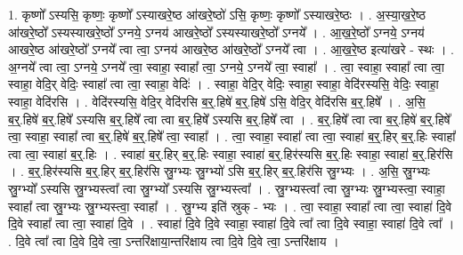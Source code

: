 \documentclass[17pt]{extarticle}
\begin{document}
1. कृष्णो᳚ ऽस्यसि॒ कृष्णः॒ कृष्णो᳚ ऽस्याखरे॒ष्ठ आ॑खरे॒ष्ठो॑ ऽसि॒ कृष्णः॒ कृष्णो᳚ ऽस्याखरे॒ष्ठः । . अ॒स्या॒ख॒रे॒ष्ठ आ॑खरे॒ष्ठो᳚ ऽस्यस्याखरे॒ष्ठो᳚ ऽग्नये॒ ऽग्नय॑ आखरे॒ष्ठो᳚ ऽस्यस्याखरे॒ष्ठो᳚ ऽग्नये᳚ । . आ॒ख॒रे॒ष्ठो᳚ ऽग्नये॒ ऽग्नय॑ आखरे॒ष्ठ आ॑खरे॒ष्ठो᳚ ऽग्नये᳚ त्वा त्वा॒ ऽग्नय॑ आखरे॒ष्ठ आ॑खरे॒ष्ठो᳚ ऽग्नये᳚ त्वा । . आ॒ख॒रे॒ष्ठ इत्या॑खरे - स्थः । . अ॒ग्नये᳚ त्वा त्वा॒ ऽग्नये॒ ऽग्नये᳚ त्वा॒ स्वाहा॒ स्वाहा᳚ त्वा॒ ऽग्नये॒ ऽग्नये᳚ त्वा॒ स्वाहा᳚ । . त्वा॒ स्वाहा॒ स्वाहा᳚ त्वा त्वा॒ स्वाहा॒ वेदि॒र् वेदिः॒ स्वाहा᳚ त्वा त्वा॒ स्वाहा॒ वेदिः॑ । . स्वाहा॒ वेदि॒र् वेदिः॒ स्वाहा॒ स्वाहा॒ वेदि॑रस्यसि॒ वेदिः॒ स्वाहा॒ स्वाहा॒ वेदि॑रसि । . वेदि॑रस्यसि॒ वेदि॒र् वेदि॑रसि ब॒र्॒.हिषे॑ ब॒र्॒.हिषे॑ ऽसि॒ वेदि॒र् वेदि॑रसि ब॒र्॒.हिषे᳚ । . अ॒सि॒ ब॒र्॒.हिषे॑ ब॒र्॒.हिषे᳚ ऽस्यसि ब॒र्॒.हिषे᳚ त्वा त्वा ब॒र्॒.हिषे᳚ ऽस्यसि ब॒र्॒.हिषे᳚ त्वा । . ब॒र्॒.हिषे᳚ त्वा त्वा ब॒र्॒.हिषे॑ ब॒र्॒.हिषे᳚ त्वा॒ स्वाहा॒ स्वाहा᳚ त्वा ब॒र्॒.हिषे॑ ब॒र्॒.हिषे᳚ त्वा॒ स्वाहा᳚ । . त्वा॒ स्वाहा॒ स्वाहा᳚ त्वा त्वा॒ स्वाहा॑ ब॒र्॒.हिर् ब॒र्॒.हिः स्वाहा᳚ त्वा त्वा॒ स्वाहा॑ ब॒र्॒.हिः । . स्वाहा॑ ब॒र्॒.हिर् ब॒र्॒.हिः स्वाहा॒ स्वाहा॑ ब॒र्॒.हिर॑स्यसि ब॒र्॒.हिः स्वाहा॒ स्वाहा॑ ब॒र्॒.हिर॑सि । . ब॒र्॒.हिर॑स्यसि ब॒र्॒.हिर् ब॒र्॒.हिर॑सि स्रु॒ग्भ्यः स्रु॒ग्भ्यो॑ ऽसि ब॒र्॒.हिर् ब॒र्॒.हिर॑सि स्रु॒ग्भ्यः । . अ॒सि॒ स्रु॒ग्भ्यः स्रु॒ग्भ्यो᳚ ऽस्यसि स्रु॒ग्भ्यस्त्वा᳚ त्वा स्रु॒ग्भ्यो᳚ ऽस्यसि स्रु॒ग्भ्यस्त्वा᳚ । . स्रु॒ग्भ्यस्त्वा᳚ त्वा स्रु॒ग्भ्यः स्रु॒ग्भ्यस्त्वा॒ स्वाहा॒ स्वाहा᳚ त्वा स्रु॒ग्भ्यः स्रु॒ग्भ्यस्त्वा॒ स्वाहा᳚ । . स्रु॒ग्भ्य इति॑ स्रुक् - भ्यः । . त्वा॒ स्वाहा॒ स्वाहा᳚ त्वा त्वा॒ स्वाहा॑ दि॒वे दि॒वे स्वाहा᳚ त्वा त्वा॒ स्वाहा॑ दि॒वे । . स्वाहा॑ दि॒वे दि॒वे स्वाहा॒ स्वाहा॑ दि॒वे त्वा᳚ त्वा दि॒वे स्वाहा॒ स्वाहा॑ दि॒वे त्वा᳚ । . दि॒वे त्वा᳚ त्वा दि॒वे दि॒वे त्वा॒ ऽन्तरि॑क्षाया॒न्तरि॑क्षाय त्वा दि॒वे दि॒वे त्वा॒ ऽन्तरि॑क्षाय । \newline
\end{document}
